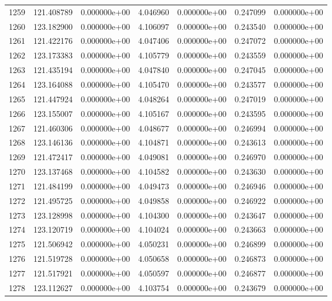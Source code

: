 \begin{tabular}{rrrrrrr}
1259 & 121.408789 &  0.000000e+00 &  4.046960 &  0.000000e+00 &    0.247099 &  0.000000e+00 \\
1260 & 123.182900 &  0.000000e+00 &  4.106097 &  0.000000e+00 &    0.243540 &  0.000000e+00 \\
1261 & 121.422176 &  0.000000e+00 &  4.047406 &  0.000000e+00 &    0.247072 &  0.000000e+00 \\
1262 & 123.173383 &  0.000000e+00 &  4.105779 &  0.000000e+00 &    0.243559 &  0.000000e+00 \\
1263 & 121.435194 &  0.000000e+00 &  4.047840 &  0.000000e+00 &    0.247045 &  0.000000e+00 \\
1264 & 123.164088 &  0.000000e+00 &  4.105470 &  0.000000e+00 &    0.243577 &  0.000000e+00 \\
1265 & 121.447924 &  0.000000e+00 &  4.048264 &  0.000000e+00 &    0.247019 &  0.000000e+00 \\
1266 & 123.155007 &  0.000000e+00 &  4.105167 &  0.000000e+00 &    0.243595 &  0.000000e+00 \\
1267 & 121.460306 &  0.000000e+00 &  4.048677 &  0.000000e+00 &    0.246994 &  0.000000e+00 \\
1268 & 123.146136 &  0.000000e+00 &  4.104871 &  0.000000e+00 &    0.243613 &  0.000000e+00 \\
1269 & 121.472417 &  0.000000e+00 &  4.049081 &  0.000000e+00 &    0.246970 &  0.000000e+00 \\
1270 & 123.137468 &  0.000000e+00 &  4.104582 &  0.000000e+00 &    0.243630 &  0.000000e+00 \\
1271 & 121.484199 &  0.000000e+00 &  4.049473 &  0.000000e+00 &    0.246946 &  0.000000e+00 \\
1272 & 121.495725 &  0.000000e+00 &  4.049858 &  0.000000e+00 &    0.246922 &  0.000000e+00 \\
1273 & 123.128998 &  0.000000e+00 &  4.104300 &  0.000000e+00 &    0.243647 &  0.000000e+00 \\
1274 & 123.120719 &  0.000000e+00 &  4.104024 &  0.000000e+00 &    0.243663 &  0.000000e+00 \\
1275 & 121.506942 &  0.000000e+00 &  4.050231 &  0.000000e+00 &    0.246899 &  0.000000e+00 \\
1276 & 121.519728 &  0.000000e+00 &  4.050658 &  0.000000e+00 &    0.246873 &  0.000000e+00 \\
1277 & 121.517921 &  0.000000e+00 &  4.050597 &  0.000000e+00 &    0.246877 &  0.000000e+00 \\
1278 & 123.112627 &  0.000000e+00 &  4.103754 &  0.000000e+00 &    0.243679 &  0.000000e+00 \\

\end{tabular}
